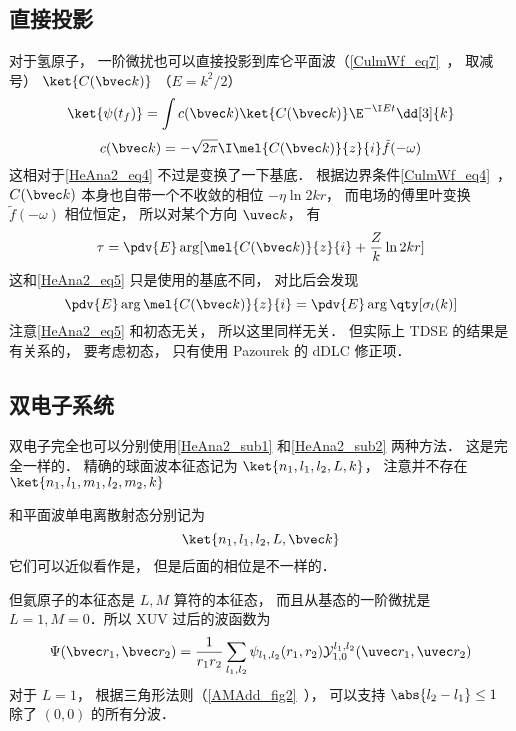 \subsection{直接投影}\label{HeAna2_sub2}
对于氢原子， 一阶微扰也可以直接投影到库仑平面波（\autoref{CulmWf_eq7}~， 取减号） $\ket{C(\bvec k)}$ （$E = k^2/2$）
\begin{equation}
\ket{\psi(t_f)} = \int c(\bvec k)\ket{C(\bvec k)} \E^{-\I E t} \dd[3]{k}
\end{equation}
\begin{equation}
c(\bvec k) = -\sqrt{2\pi}\I\mel{C(\bvec k)}{z}{i} \tilde f(-\omega)
\end{equation}
这相对于\autoref{HeAna2_eq4} 不过是变换了一下基底． 根据边界条件\autoref{CulmWf_eq4}~， $C(\bvec k)$ 本身也自带一个不收敛的相位 $-\eta \ln 2kr$， 而电场的傅里叶变换 $\tilde f(-\omega)$ 相位恒定， 所以对某个方向 $\uvec k$， 有
\begin{equation}
\tau = \pdv{E} \arg[\mel{C(\bvec k)}{z}{i} + \frac{Z}{k}\ln 2kr]
\end{equation}
这和\autoref{HeAna2_eq5} 只是使用的基底不同， 对比后会发现
\begin{equation}
\pdv{E} \arg\mel{C(\bvec k)}{z}{i} = \pdv{E} \arg\qty[\sigma_l(k)]
\end{equation}
注意\autoref{HeAna2_eq5} 和初态无关， 所以这里同样无关． 但实际上 TDSE 的结果是有关系的， 要考虑初态， 只有使用 Pazourek 的 dDLC 修正项．

\subsection{双电子系统}
双电子完全也可以分别使用\autoref{HeAna2_sub1} 和\autoref{HeAna2_sub2} 两种方法． 这是完全一样的． 精确的球面波本征态记为 $\ket{n_1,l_1,l_2,L,k}$， 注意并不存在 $\ket{n_1,l_1,m_1, l_2, m_2, k}$


和平面波单电离散射态分别记为
\begin{equation}
\ket{n_1,l_1,l_2,L,\bvec k}
\end{equation}
它们可以近似看作是， 但是后面的相位是不一样的．

但氦原子的本征态是 $L,M$ 算符的本征态， 而且从基态的一阶微扰是 $L = 1, M = 0$．所以 XUV 过后的波函数为
\begin{equation}
\Psi(\bvec r_1, \bvec r_2) = \frac{1}{r_1 r_2}\sum_{l_1,l_2} \psi_{l_1,l_2}(r_1, r_2)\mathcal Y_{1,0}^{l_1,l_2}(\uvec r_1, \uvec r_2)
\end{equation}
对于 $L = 1$， 根据三角形法则（\autoref{AMAdd_fig2}~）， 可以支持 $\abs{l_2 - l_1} \le 1$ 除了 $(0,0)$ 的所有分波． 


